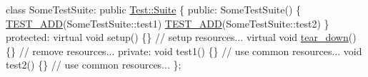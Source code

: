 \begin{DoxyCode}
\textcolor{keyword}{class }SomeTestSuite: \textcolor{keyword}{public} \hyperlink{class_test_1_1_suite}{Test::Suite}
\{
\textcolor{keyword}{public}:
    SomeTestSuite() 
    \{ 
        \hyperlink{cpptest-suite_8h_abe8c3e0a2cf3893ebc1c265264ed9cb8}{TEST\_ADD}(SomeTestSuite::test1) 
        \hyperlink{cpptest-suite_8h_abe8c3e0a2cf3893ebc1c265264ed9cb8}{TEST\_ADD}(SomeTestSuite::test2) 
    \}
protected:
    virtual \textcolor{keywordtype}{void} setup()     \{\} \textcolor{comment}{// setup resources... }
    \textcolor{keyword}{virtual} \textcolor{keywordtype}{void} \hyperlink{class_test_1_1_suite_a37d3595625cff09b8e43bf6c414ff610}{tear\_down}() \{\} \textcolor{comment}{// remove resources...}
\textcolor{keyword}{private}:
    \textcolor{keywordtype}{void} test1() \{\} \textcolor{comment}{// use common resources...}
    \textcolor{keywordtype}{void} test2() \{\} \textcolor{comment}{// use common resources...}
\};
\end{DoxyCode}
 